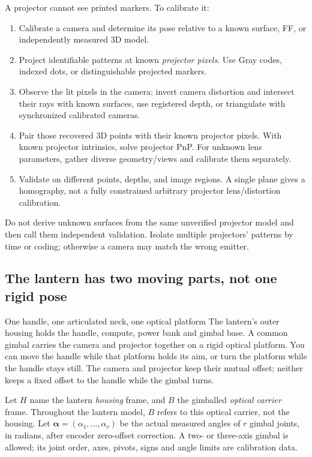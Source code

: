 \documentclass[11pt,a4paper]{article}
\begin{document}
A projector cannot see printed markers. To calibrate it:
\begin{enumerate}
  \item Calibrate a camera and determine its pose relative to a known surface,
    FF, or independently measured 3D model.
  \item Project identifiable patterns at known \emph{projector pixels}.
    Use Gray codes, indexed dots, or distinguishable projected markers.
  \item Observe the lit pixels in the camera; invert camera distortion and
    intersect their rays with known surfaces, use registered depth, or
    triangulate with synchronized calibrated cameras.
  \item Pair those recovered 3D points with their known projector pixels.
    With known projector intrinsics, solve projector PnP. For unknown lens
    parameters, gather diverse geometry/views and calibrate them separately.
  \item Validate on different points, depths, and image regions. A single
    plane gives a homography, not a fully constrained arbitrary projector
    lens/distortion calibration.
\end{enumerate}
Do not derive unknown surfaces from the same unverified projector model
and then call them independent validation. Isolate multiple projectors'
patterns by time or coding; otherwise a camera may match the wrong emitter.

\subsection{The lantern has two moving parts, not one rigid pose}
\begin{plain}{One handle, one articulated neck, one optical platform}
The lantern's outer housing holds the handle, compute, power bank and
gimbal base. A common gimbal carries the camera and projector together
on a rigid optical platform. You can move the handle while that platform
holds its aim, or turn the platform while the handle stays still.
The camera and projector keep their mutual offset; neither keeps a fixed
offset to the handle while the gimbal turns.
\end{plain}

Let $H$ name the lantern \emph{housing} frame, and $B$ the gimballed
\emph{optical carrier} frame. Throughout the lantern model, $B$ refers to
this optical carrier, not the housing.
Let $\bm{\alpha}=(\alpha_1,\ldots,\alpha_r)$ be the actual measured angles
of $r$ gimbal joints, in radians, after encoder zero-offset correction.
A two- or three-axis gimbal is allowed; its joint order, axes, pivots,
signs and angle limits are calibration data.
\end{document}

